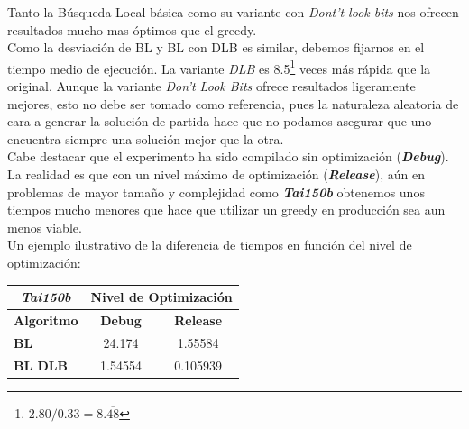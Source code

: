 \documentclass[a4paper, 12pt]{article}
\begin{document}
      Tanto la Búsqueda Local básica como su variante con \textit{Dont't look bits} nos ofrecen resultados mucho mas óptimos que el greedy. \\
      
      Como la desviación de BL y BL con DLB es similar, debemos fijarnos en el tiempo medio de ejecución. La variante \textit{DLB} es 8.5\footnote{$2.80/0.33 = 8.\overline{48}$} veces más rápida que la original. Aunque la variante \textit{Don't Look Bits} ofrece resultados ligeramente mejores, esto no debe ser tomado como referencia, pues la naturaleza aleatoria de cara a generar la solución de partida hace que no podamos asegurar que uno encuentra siempre una solución mejor que la otra.\\
      
      Cabe destacar que el experimento ha sido compilado sin optimización (\textbf{\textit{Debug}}). La realidad es que con un nivel máximo de optimización (\textbf{\textit{Release}}), aún en problemas de mayor tamaño y complejidad como \textbf{\textit{Tai150b}} obtenemos unos tiempos mucho menores que hace que utilizar un greedy en producción sea aun menos viable.\\
      
      Un ejemplo ilustrativo de la diferencia de tiempos en función del nivel de optimización:
      
\begin{table}[H]
\centering
\label{my-label}
\begin{tabular}{l|c|c|}
\cline{2-3}
\multicolumn{1}{c|}{{\textit{Tai150b}}} & \multicolumn{2}{c|}{\textbf{Nivel de Optimización}} \\ \hline
\multicolumn{1}{|c|}{\textbf{Algoritmo}}    & \textbf{Debug}          & \textbf{Release}          \\ \hline
\multicolumn{1}{|l|}{\textbf{BL}}           & 24.174                  & 1.55584                   \\ \hline
\multicolumn{1}{|l|}{\textbf{BL DLB}}       & 1.54554                 & 0.105939                  \\ \hline
\end{tabular}
\end{table}
   
\printindex
\end{document}

